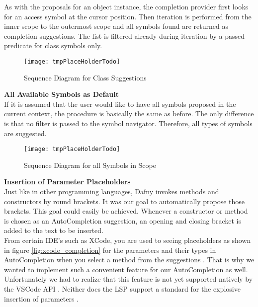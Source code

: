 As with the proposals for an object instance,
the completion provider first looks for an access symbol at the cursor position.
Then iteration is performed from the inner scope
to the outermost scope and all symbols found are returned as completion suggestions.
The list is filtered already during iteration by a passed predicate for class symbols only.

\begin{figure}[H]
    \centering
    \texttt{[image: tmpPlaceHolderTodo]}
    \caption{Sequence Diagram for Class Suggestions}
    \label{fig:new_completion_diagram}
\end{figure}

\textbf{All Available Symbols as Default}\\
If it is assumed that the user would like to have all symbols proposed in the current context,
the procedure is basically the same as before.
The only difference is that no filter is passed to the symbol navigator.
Therefore, all types of symbols are suggested.

\begin{figure}[H]
    \centering
    \texttt{[image: tmpPlaceHolderTodo]}
    \caption{Sequence Diagram for all Symbols in Scope}
    \label{fig:default_completion_diagram}
\end{figure}


\textbf{Insertion of Parameter Placeholders}\\
Just like in other programming languages, Dafny invokes methods and constructors by round brackets.
It was our goal to automatically propose those brackets.
This goal could easily be achieved.
Whenever a constructor or method is chosen as an AutoCompletion suggestion,
an opening and closing bracket is added to the text to be inserted. \\

From certain IDE's such as XCode,
you are used to seeing placeholders as shown in figure \ref{fig:xcode_completion} for the parameters and their types in AutoCompletion
when you select a method from the suggestions \cite{sa}.
That is why we wanted to implement such a convenient feature for our AutoCompletion as well.
Unfortunately we had to realize that this feature is not yet supported natively by the VSCode API \cite{vscodeAPI}.
Neither does the LSP support a standard for the explosive insertion of parameters \cite{lspspec}.

